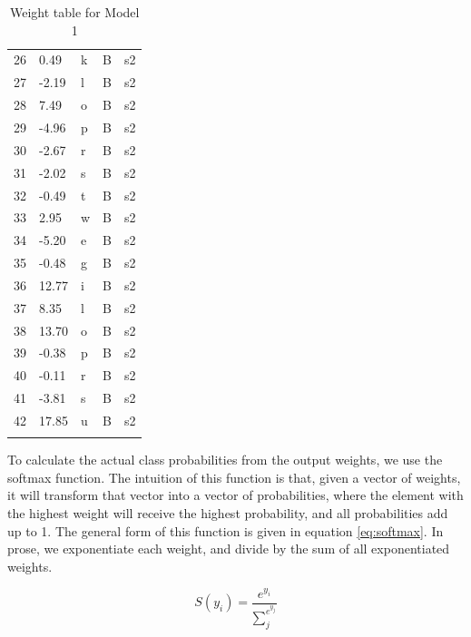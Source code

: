 \begin{table}[!htpb]
\begin{tabular}{lllll}
    26 & 0.49   & k         & B        & s2       \\
    27 & -2.19  & l         & B        & s2       \\
    28 & 7.49   & o         & B        & s2       \\
    29 & -4.96  & p         & B        & s2       \\
    30 & -2.67  & r         & B        & s2       \\
    31 & -2.02  & s         & B        & s2       \\
    32 & -0.49  & t         & B        & s2       \\
    33 & 2.95   & w         & B        & s2       \\
    34 & -5.20  & e         & B        & s2       \\
    35 & -0.48  & g         & B        & s2       \\
    36 & 12.77  & i         & B        & s2       \\
    37 & 8.35   & l         & B        & s2       \\
    38 & 13.70  & o         & B        & s2       \\
    39 & -0.38  & p         & B        & s2       \\
    40 & -0.11  & r         & B        & s2       \\
    41 & -3.81  & s         & B        & s2       \\
    42 & 17.85  & u         & B        & s2       \\
    \lspbottomrule
  \end{tabular}\caption{Weight table for Model 1}\label{tab:model1-weights}
\end{table}

To calculate the actual class probabilities from the output weights, we use the softmax function. The intuition of this function is that, given a vector of weights, it will transform that vector into a vector of probabilities, where the element with the highest weight will receive the highest probability, and all probabilities add up to 1. The general form of this function is given in equation \eqref{eq:softmax}. In prose, we exponentiate each weight, and divide by the sum of all exponentiated weights.  


\begin{equation}\label{eq:softmax}
    S(y_i) = \frac{e^{y_i}}{\sum_{j}^{e^{y_j}}}
\end{equation}

